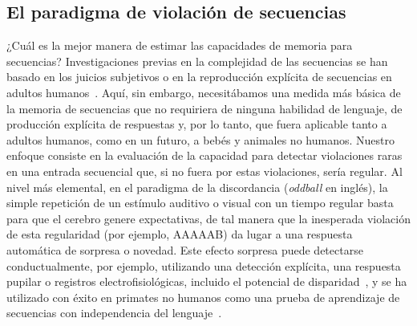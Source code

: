 \subsection{El paradigma de violación de secuencias}


¿Cuál es la mejor manera de estimar las capacidades de memoria para secuencias? Investigaciones previas en la complejidad de las secuencias se han basado en los juicios subjetivos o en la reproducción explícita de secuencias en adultos humanos~\cite{f61}. Aquí, sin embargo, necesitábamos una medida más básica de la memoria de secuencias que no requiriera de ninguna habilidad de lenguaje, de producción explícita de respuestas y, por lo tanto, que fuera aplicable tanto a adultos humanos, como en un futuro, a bebés y animales no humanos. Nuestro enfoque consiste en la evaluación de la capacidad para detectar violaciones raras en una entrada secuencial que, si no fuera por estas violaciones, sería regular. Al nivel más elemental, en el paradigma de la discordancia ({\em oddball} en inglés), la simple repetición de un estímulo auditivo o visual con un tiempo regular basta para que el cerebro genere expectativas, de tal manera que la inesperada violación de esta regularidad (por ejemplo, AAAAAB) da lugar a una respuesta automática de sorpresa o novedad. Este efecto sorpresa puede detectarse conductualmente, por ejemplo, utilizando una detección explícita, una respuesta pupilar o registros electrofisiológicas, incluido el potencial de disparidad~\cite{f62,f63,f64}, y se ha utilizado con éxito en primates no humanos como una prueba de aprendizaje de secuencias con independencia del lenguaje~\cite{f5,f65,f66}.

